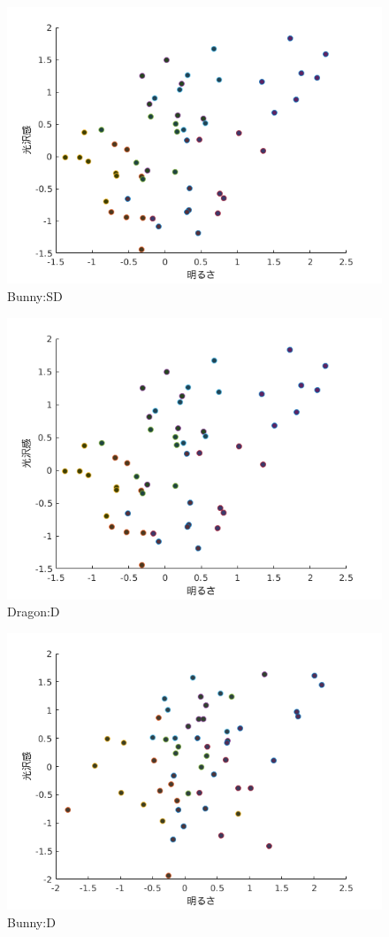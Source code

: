     \begin{figure}
        \centering
        \includegraphics[width=12.0cm]{./img/ex3_BSD.png}
        \caption{Bunny:SD}
        \label{ex3_DSD}
    \end{figure}

    \begin{figure}
        \centering
        \includegraphics[width=12.0cm]{./img/ex3_DD.png}
        \caption{Dragon:D}
        \label{ex3_DD}
    \end{figure}

    \begin{figure}
        \centering
        \includegraphics[width=12.0cm]{./img/ex3_BD.png}
        \caption{Bunny:D}
        \label{ex3_BD}
    \end{figure}

